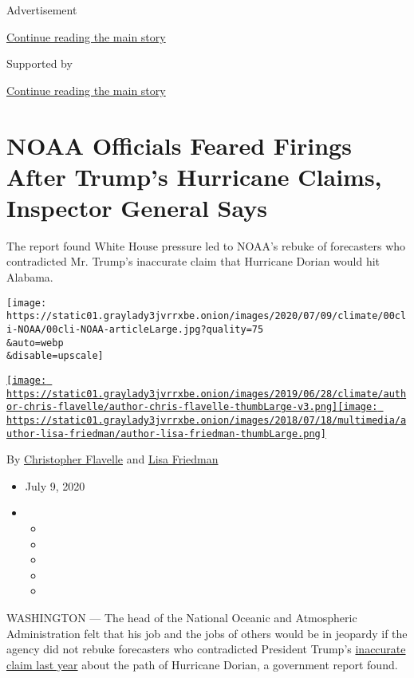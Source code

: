 Advertisement

\protect\hyperlink{after-top}{Continue reading the main story}

Supported by

\protect\hyperlink{after-sponsor}{Continue reading the main story}

\hypertarget{noaa-officials-feared-firings-after-trumps-hurricane-claims-inspector-general-says}{%
\section{NOAA Officials Feared Firings After Trump's Hurricane Claims,
Inspector General
Says}\label{noaa-officials-feared-firings-after-trumps-hurricane-claims-inspector-general-says}}

The report found White House pressure led to NOAA's rebuke of
forecasters who contradicted Mr. Trump's inaccurate claim that Hurricane
Dorian would hit Alabama.

\texttt{[image: https://static01.graylady3jvrrxbe.onion/images/2020/07/09/climate/00cli-NOAA/00cli-NOAA-articleLarge.jpg?quality=75\\\&auto=webp\\\&disable=upscale]}

\href{https://www.nytimes3xbfgragh.onion/by/christopher-flavelle}{\texttt{[image: https://static01.graylady3jvrrxbe.onion/images/2019/06/28/climate/author-chris-flavelle/author-chris-flavelle-thumbLarge-v3.png]}}\href{https://www.nytimes3xbfgragh.onion/by/lisa-friedman}{\texttt{[image: https://static01.graylady3jvrrxbe.onion/images/2018/07/18/multimedia/author-lisa-friedman/author-lisa-friedman-thumbLarge.png]}}

By
\href{https://www.nytimes3xbfgragh.onion/by/christopher-flavelle}{Christopher
Flavelle} and
\href{https://www.nytimes3xbfgragh.onion/by/lisa-friedman}{Lisa
Friedman}

\begin{itemize}
\item
  July 9, 2020
\item
  \begin{itemize}
  \item
  \item
  \item
  \item
  \item
  \end{itemize}
\end{itemize}

WASHINGTON --- The head of the National Oceanic and Atmospheric
Administration felt that his job and the jobs of others would be in
jeopardy if the agency did not rebuke forecasters who contradicted
President Trump's
\href{https://www.nytimes3xbfgragh.onion/2019/09/09/climate/hurricane-dorian-trump-tweet.html}{inaccurate
claim last year} about the path of Hurricane Dorian, a government report
found.

